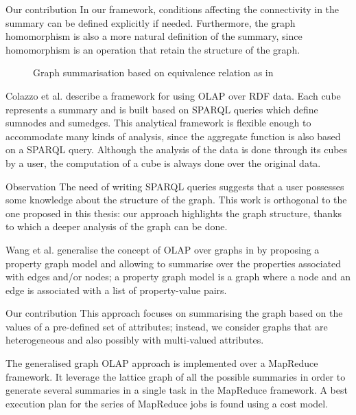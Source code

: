 \begin{centeremph}{Our contribution}
	In our framework, conditions affecting the connectivity in the summary can be defined explicitly if needed. Furthermore, the graph homomorphism is also a more natural definition of the summary, since homomorphism is an operation that retain the structure of the graph.
\end{centeremph}

\begin{figure}
	\centering
	\resizebox{.5\textwidth}{!}{
		
	}
	\caption{Graph summarisation based on equivalence relation as in \cite{zhao:sigmod:2011}}
	\label{chap3:review:fig:graph-cube}
\end{figure}

Colazzo et al. \cite{colazzo:www:2014} describe a framework for using OLAP over RDF data. Each cube represents a summary and is built based on SPARQL queries which define sumnodes and sumedges. This analytical framework is flexible enough to accommodate many kinds of analysis, since the aggregate function is also based on a SPARQL query. Although the analysis of the data is done through its cubes by a user, the computation of a cube is always done over the original data.

\begin{centeremph}{Observation}
 	The need of writing SPARQL queries suggests that a user possesses some knowledge about the structure of the graph. This work is orthogonal to the one proposed in this thesis: our approach highlights the graph structure, thanks to which a deeper analysis of the graph can be done.
\end{centeremph}

Wang et al. generalise the concept of OLAP over graphs in \cite{zhengkui:2014:ppg} by proposing a property graph model and allowing to summarise over the properties associated with edges and/or nodes; a property graph model is a graph where a node and an edge is associated with a list of property-value pairs.

\begin{centeremph}{Our contribution}
	This approach focuses on summarising the graph based on the values of a pre-defined set of attributes; instead, we consider graphs that are heterogeneous and also possibly with multi-valued attributes.%
\end{centeremph}

The generalised graph OLAP approach \cite{zhengkui:2014:ppg} is implemented over a MapReduce \cite{dean:2008:msd} framework. It leverage the lattice graph of all the possible summaries in order to generate several summaries in a single task in the MapReduce framework. A best execution plan for the series of MapReduce jobs is found using a cost model.

